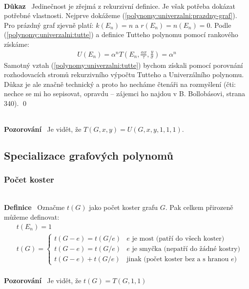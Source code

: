 \documentclass{article}
\renewcommand{\paragraph}[1]{\ \\\smallskip\noindent\textbf{#1}\ }
\begin{document}
\paragraph{Důkaz} Jedinečnost je zřejmá z rekurzivní definice. Je však potřeba 
dokázat potřebné vlastnosti. Nejprve dokážeme 
(\ref{polynomy:univerzalni:prazdny-graf}). Pro prázdný graf zjevně platí: 
$k(E_n) = n$ a $r(E_n) = n(E_n) = 0$. Podle (\ref{polynomy:univerzalni:tutte}) a 
definice Tutteho polynomu pomocí rankového získáme:
\begin{align}
	U(E_n) = \alpha^n T\left(E_n, \frac{\alpha x}{\tau}, \frac{y}{\sigma}\right) 
	= \alpha^n
\end{align}
Samotný vztah (\ref{polynomy:univerzalni:tutte}) bychom získali pomocí porovnání 
rozhodovacích stromů rekurzivního výpočtu Tutteho a Univerzálního polynomu.  
Důkaz je ale značně technický a proto ho necháme čtenáři na rozmyšlení (čti: 
nechce se mi ho sepisovat, opravdu -- zájemci ho najdou v B. Bollobásovi, strana 
340). \qed

\paragraph{Pozorování}
Je vidět, že $T(G, x, y) = U(G, x, y, 1, 1, 1)$.

\subsection{Specializace grafových polynomů}
\subsubsection{Počet koster}
\paragraph{Definice}
Označme $t(G)$ jako počet koster grafu $G$. Pak celkem přirozeně můžeme 
definovat:
\begin{align}
	&t(E_n) = 1 \\
	&t(G) = \left\{ \begin{array}{ll}
	t(G - e) = t(G/e)& e \text{ je most (patří do všech koster)} \\
	t(G - e) = t(G/e)& e \text{ je smyčka (nepatří do žádné kostry)}\\
	t(G-e) + t(G/e) & \text{jinak (počet koster bez a s hranou $e$)}
	\end{array}
	\right.
\end{align}
\paragraph{Pozorování} Je vidět, že $t(G) = T(G, 1, 1)$
\end{document}

